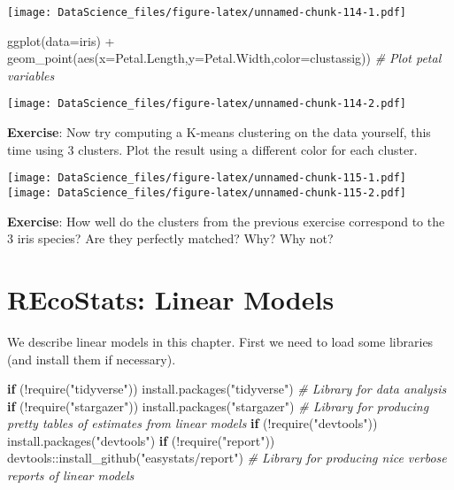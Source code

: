 \documentclass[
]{book}
\newenvironment{Shaded}{\begin{snugshade}}{\end{snugshade}}
\newcommand{\AttributeTok}[1]{\textcolor[rgb]{0.77,0.63,0.00}{#1}}
\newcommand{\CommentTok}[1]{\textcolor[rgb]{0.56,0.35,0.01}{\textit{#1}}}
\newcommand{\ControlFlowTok}[1]{\textcolor[rgb]{0.13,0.29,0.53}{\textbf{#1}}}
\newcommand{\FunctionTok}[1]{\textcolor[rgb]{0.00,0.00,0.00}{#1}}
\newcommand{\NormalTok}[1]{#1}
\newcommand{\SpecialCharTok}[1]{\textcolor[rgb]{0.00,0.00,0.00}{#1}}
\newcommand{\StringTok}[1]{\textcolor[rgb]{0.31,0.60,0.02}{#1}}
\begin{document}
\texttt{[image: DataScience\_files/figure-latex/unnamed-chunk-114-1.pdf]}

\begin{Shaded}
\begin{Highlighting}[]
\FunctionTok{ggplot}\NormalTok{(}\AttributeTok{data=}\NormalTok{iris) }\SpecialCharTok{+} \FunctionTok{geom\_point}\NormalTok{(}\FunctionTok{aes}\NormalTok{(}\AttributeTok{x=}\NormalTok{Petal.Length,}\AttributeTok{y=}\NormalTok{Petal.Width,}\AttributeTok{color=}\NormalTok{clustassig)) }\CommentTok{\# Plot petal variables}
\end{Highlighting}
\end{Shaded}

\texttt{[image: DataScience\_files/figure-latex/unnamed-chunk-114-2.pdf]}

\textbf{Exercise}: Now try computing a K-means clustering on the data yourself, this time using 3 clusters. Plot the result using a different color for each cluster.

\texttt{[image: DataScience\_files/figure-latex/unnamed-chunk-115-1.pdf]} \texttt{[image: DataScience\_files/figure-latex/unnamed-chunk-115-2.pdf]}

\textbf{Exercise}: How well do the clusters from the previous exercise correspond to the 3 iris species? Are they perfectly matched? Why? Why not?

\hypertarget{recostats-linear-models}{%
\chapter{REcoStats: Linear Models}\label{recostats-linear-models}}

We describe linear models in this chapter. First we need to load some libraries (and install them if necessary).

\begin{Shaded}
\begin{Highlighting}[]
\ControlFlowTok{if}\NormalTok{ (}\SpecialCharTok{!}\FunctionTok{require}\NormalTok{(}\StringTok{"tidyverse"}\NormalTok{)) }\FunctionTok{install.packages}\NormalTok{(}\StringTok{"tidyverse"}\NormalTok{) }\CommentTok{\# Library for data analysis}
\ControlFlowTok{if}\NormalTok{ (}\SpecialCharTok{!}\FunctionTok{require}\NormalTok{(}\StringTok{"stargazer"}\NormalTok{)) }\FunctionTok{install.packages}\NormalTok{(}\StringTok{"stargazer"}\NormalTok{) }\CommentTok{\# Library for producing pretty tables of estimates from linear models}
\ControlFlowTok{if}\NormalTok{ (}\SpecialCharTok{!}\FunctionTok{require}\NormalTok{(}\StringTok{"devtools"}\NormalTok{)) }\FunctionTok{install.packages}\NormalTok{(}\StringTok{"devtools"}\NormalTok{)}
\ControlFlowTok{if}\NormalTok{ (}\SpecialCharTok{!}\FunctionTok{require}\NormalTok{(}\StringTok{"report"}\NormalTok{)) devtools}\SpecialCharTok{::}\FunctionTok{install\_github}\NormalTok{(}\StringTok{"easystats/report"}\NormalTok{) }\CommentTok{\# Library for producing nice verbose reports of linear models}
\end{Highlighting}
\end{Shaded}
\end{document}

